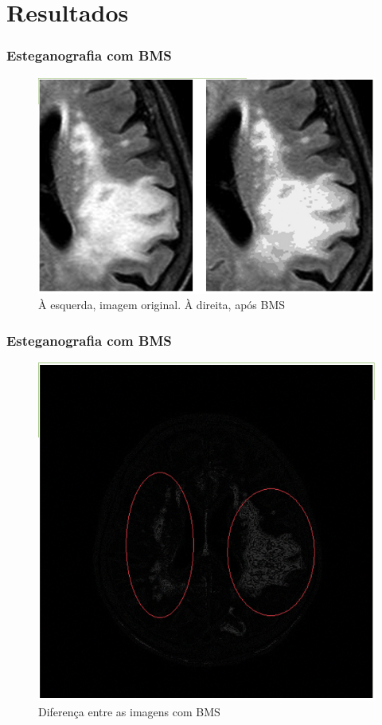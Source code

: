 \documentclass{beamer}
\begin{document}
\section{Resultados}
\begin{frame}
\frametitle{Esteganografia com BMS}
\begin{figure}
\includegraphics[scale=.2]{BMS.png} 
\caption{À esquerda, imagem original. À direita, após BMS}

\end{figure}
\end{frame}
\begin{frame}
\frametitle{Esteganografia com BMS}
\begin{figure}
\includegraphics[scale=.2]{BMSdiff.png} 
\caption{Diferença entre as imagens com BMS}

\end{figure}
\end{frame}
\end{document}
